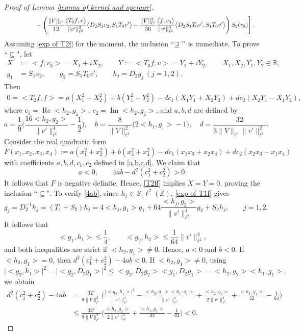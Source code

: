 \documentclass[reqno, 11pt]{amsart}
\newcommand\R{\mathbb{R}}
\newcommand\Z{\mathbb{Z}}
\numberwithin{equation}{section}
\begin{document}
\begin{proof}[Proof of Lemma {\ref{lemma of kernel and operaor}}]
\begin{align}
&\qquad\qquad\quad-\left.\left(\frac{\|V\|_{\ell^1}}{12}\frac{\big<T_0f,v\big>}{\|v'\|^2_{\ell^2}}\big<D_2S_1v_2,S_1T_0v'\big>-\frac{\|V\|^2_{\ell^1}}{36}\frac{\big<f,v_3\big>}{\|v'\|^4_{\ell^2}}\big<D_2S_1T_0v',S_1T_0v'\big>\right)S_2(v_3)\right].\notag
\end{align}
Assuming \eqref{exp of T2f} for the moment, the inclusion ``$\supseteq"$ is immediate. To prove ``$\subseteq$", let
\begin{align*}
X&:=\big<f,v_3\big>=X_1+iX_2,\qquad Y:=\big<T_0f,v\big>=Y_1+iY_2, \qquad X_1,X_2,Y_1,Y_2\in\R,\\
g_1&=S_1v_2,\qquad g_2=S_1T_0v',\qquad h_j=D_2g_j~(j=1,2).
\end{align*}
Then
\begin{align}\label{T2ff}
0=\big<T_2f,f\big>=a(X^2_1+X^2_2)+b(Y^2_1+Y^2_2)-dc_1(X_1Y_1+X_2Y_2)+dc_2(X_2Y_1-X_1Y_2),
\end{align}
where $c_1=\operatorname{Re}\big<h_2,g_1\big>$, $c_2=\operatorname{Im}\big<h_2,g_1\big>$, and $a,b,d$ are defined by
\begin{equation}\label{a,b,c,d}
a=\frac{1}{9}\Big(\frac{16\big<h_2,g_2\big>}{\|v'\|^4_{\ell^2}}-\frac{1}{2}\Big),\quad b=\frac{8}{\|V\|^2_{\ell^1}}\big(2\big<h_1,g_1\big>-1\big),\quad
d=\frac{32}{3\|V\|_{\ell^1}\|v'\|^2_{\ell^2}}.
\end{equation}
Consider the real quadratic form
$$F(x_1,x_2,x_3,x_4):=a(x^2_1+x^2_2)+b(x^2_3+x^2_4)-dc_1(x_1x_3+x_2x_4)+dc_2(x_2x_3-x_1x_4)$$
with coefficients $a,b,d,c_1,c_2$ defined in \eqref{a,b,c,d}. We claim that
\begin{equation}\label{4ab}
a<0,\qquad 4ab-d^2(c^2_1+c^2_2)>0.
\end{equation}
It follows that $F$ is negative definite. Hence, \eqref{T2ff} implies $X=Y=0$, proving the inclusion ``$\subseteq$". To verify \eqref{4ab}, since $h_j\in S_1\ell^2(\Z)$, \eqref{exp of T1f} gives
\begin{equation*}
g_j=D^{-1}_2h_j=(T_1+S_2)h_j=4\big<h_j,g_1\big>g_1+64\frac{\big<h_j,g_2\big>}{\|v'\|^4_{\ell^2}}g_2+S_2h_j,\qquad j=1,2.
\end{equation*}
It follows that $$\big<g_1,h_1\big>\leq\frac{1}{4},\qquad \big<g_2,h_2\big>\leq\frac{1}{64}\|v'\|^4_{\ell^2},$$
and both inequalities are strict if $\big<h_2,g_1\big>\neq0$.
Hence, $a<0$ and $b<0$. If $\big<h_2,g_1\big>=0$, then $d^2(c^2_1+c^2_2)-4ab<0$. If $\big<h_2,g_1\big>\neq0$, using 
$$\big|\big<g_2,h_1\big>\big|^2=\big|\big<g_2,D_2g_1\big>\big|^2\leq\big<g_2,D_2g_2\big>\big<g_1,D_2g_1\big>=\big<h_2,g_2\big>\big<h_1,g_1\big>,$$
we obtain
\begin{align*}
d^2(c^2_1+c^2_2)-4ab&=\frac{32^2}{9\|V\|^2_{\ell^1}}\Big(\frac{\big|\big<g_2,h_1\big>\big|^2}{\|v'\|^4_{\ell^2}}-\frac{\big<h_2,g_2\big>\big<h_1,g_1\big>}{\|v'\|^4_{\ell^2}}+\frac{\big<h_2,g_2\big>}{2\|v'\|^4_{\ell^2}}+\frac{\big<h_1,g_1\big>}{32}-\frac{1}{64}\Big)\\
&\leq \frac{32^2}{9\|V\|^2_{\ell^1}}\Big(\frac{\big<h_2,g_2\big>}{2\|v'\|^4_{\ell^2}}+\frac{\big<h_1,g_1\big>}{32}-\frac{1}{64}\Big)<0.
\end{align*}


\end{proof}
\end{document}
